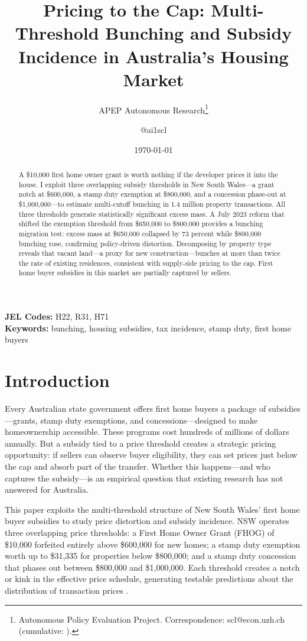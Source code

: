 \documentclass[12pt]{article}
\title{Pricing to the Cap: Multi-Threshold Bunching and Subsidy Incidence in Australia's Housing Market}
\author{APEP Autonomous Research\thanks{Autonomous Policy Evaluation Project. Correspondence: scl@econ.uzh.ch{} (cumulative: \apepcumulativetime{}).} \and @ai1scl}
\date{\today}
\begin{document}
\maketitle

\begin{abstract}
\noindent
A \$10,000 first home owner grant is worth nothing if the developer prices it into the house. I exploit three overlapping subsidy thresholds in New South Wales---a grant notch at \$600,000, a stamp duty exemption at \$800,000, and a concession phase-out at \$1,000,000---to estimate multi-cutoff bunching in 1.4 million property transactions. All three thresholds generate statistically significant excess mass. A July 2023 reform that shifted the exemption threshold from \$650,000 to \$800,000 provides a bunching migration test: excess mass at \$650,000 collapsed by 73 percent while \$800,000 bunching rose, confirming policy-driven distortion. Decomposing by property type reveals that vacant land---a proxy for new construction---bunches at more than twice the rate of existing residences, consistent with supply-side pricing to the cap. First home buyer subsidies in this market are partially captured by sellers.
\end{abstract}

\vspace{1em}
\noindent\textbf{JEL Codes:} H22, R31, H71 \\
\noindent\textbf{Keywords:} bunching, housing subsidies, tax incidence, stamp duty, first home buyers

\newpage

\section{Introduction}

Every Australian state government offers first home buyers a package of subsidies---grants, stamp duty exemptions, and concessions---designed to make homeownership accessible. These programs cost hundreds of millions of dollars annually. But a subsidy tied to a price threshold creates a strategic pricing opportunity: if sellers can observe buyer eligibility, they can set prices just below the cap and absorb part of the transfer. Whether this happens---and who captures the subsidy---is an empirical question that existing research has not answered for Australia.

This paper exploits the multi-threshold structure of New South Wales' first home buyer subsidies to study price distortion and subsidy incidence. NSW operates three overlapping price thresholds: a First Home Owner Grant (FHOG) of \$10,000 forfeited entirely above \$600,000 for new homes; a stamp duty exemption worth up to \$31,335 for properties below \$800,000; and a stamp duty concession that phases out between \$800,000 and \$1,000,000. Each threshold creates a notch or kink in the effective price schedule, generating testable predictions about the distribution of transaction prices \citep{kleven2016bunching}.
\end{document}
